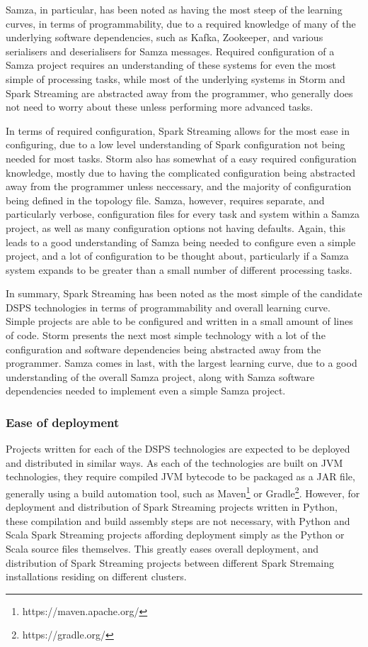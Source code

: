 Samza, in particular, has been noted as having the most steep of the learning curves, in terms of programmability, due
to a required knowledge of many of the underlying software dependencies, such as Kafka, Zookeeper, and various serialisers
and deserialisers for Samza messages. Required configuration of a Samza project requires an understanding of these systems for
even the most simple of processing tasks, while most of the underlying systems in Storm and Spark Streaming are abstracted
away from the programmer, who generally does not need to worry about these unless performing more advanced tasks.

In terms of required configuration, Spark Streaming allows for the most ease in configuring, due to a low level understanding
of Spark configuration not being needed for most tasks. Storm also has somewhat of a easy required configuration knowledge,
mostly due to having the complicated configuration being abstracted away from the programmer unless neccessary, and the
majority of configuration being defined in the topology file. Samza, however, requires separate, and particularly verbose,
configuration files for every task and system within a Samza project, as well as many configuration options not having
defaults. Again, this leads to a good understanding of Samza being needed to configure even a simple project, and a lot
of configuration to be thought about, particularly if a Samza system expands to be greater than a small number of different
processing tasks.

In summary, Spark Streaming has been noted as the most simple of the candidate DSPS technologies in terms of programmability
and overall learning curve. Simple projects are able to be configured and written in a small amount of lines of code.
Storm presents the next most simple technology with a lot of the configuration and software dependencies being abstracted
away from the programmer. Samza comes in last, with the largest learning curve, due to a good understanding of the overall
Samza project, along with Samza software dependencies needed to implement even a simple Samza project.


\subsubsection{Ease of deployment}

Projects written for each of the DSPS technologies are expected to be deployed and distributed in similar ways. As each
of the technologies are built on JVM technologies, they require compiled JVM bytecode to be packaged as a JAR file, generally
using a build automation tool, such as Maven\footnote{https://maven.apache.org/} or Gradle\footnote{https://gradle.org/}.
However, for deployment and distribution of Spark Streaming projects written in Python, these compilation and build
assembly steps are not necessary, with Python and Scala Spark Streaming projects affording deployment simply as the Python
or Scala source files themselves. This greatly eases overall deployment, and distribution of Spark Streaming projects between
different Spark Stremaing installations residing on different clusters.

